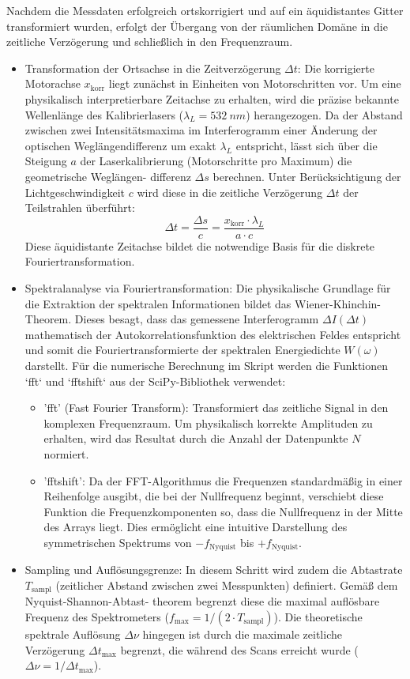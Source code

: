\documentclass[10pt,a4paper]{article}
\begin{document}
Nachdem die Messdaten erfolgreich ortskorrigiert und auf ein äquidistantes Gitter transformiert wurden, erfolgt der Übergang von der räumlichen Domäne in die zeitliche Verzögerung und schließlich in den Frequenzraum.

\begin{itemize}
       \item Transformation der Ortsachse in die Zeitverzögerung $\Delta t$: Die korrigierte Motorachse $x_{\text{korr}}$ liegt zunächst in Einheiten von Motorschritten vor. Um eine physikalisch interpretierbare Zeitachse zu erhalten, wird die präzise bekannte Wellenlänge des Kalibrierlasers ($\lambda_L = \qty{532}{nm}$) herangezogen. Da der Abstand zwischen zwei Intensitätsmaxima im Interferogramm einer Änderung der optischen Weglängendifferenz um exakt $\lambda_L$ entspricht, lässt sich über die Steigung $a$ der Laserkalibrierung (Motorschritte pro Maximum) die geometrische Weglängen- differenz $\Delta s$ berechnen. Unter Berücksichtigung der Lichtgeschwindigkeit $c$ wird diese in die zeitliche Verzögerung $\Delta t$ der Teilstrahlen überführt: $$\Delta t = \frac{\Delta s}{c} = \frac{x_{\text{korr}} \cdot \lambda_L}{a \cdot c}$$ Diese äquidistante Zeitachse bildet die notwendige Basis für die diskrete Fouriertransformation.
       \item Spektralanalyse via Fouriertransformation: Die physikalische Grundlage für die Extraktion der spektralen Informationen bildet das Wiener-Khinchin-Theorem. Dieses besagt, dass das gemessene Interferogramm $\Delta I(\Delta t)$ mathematisch der Autokorrelationsfunktion des elektrischen Feldes entspricht und somit die Fouriertransformierte der spektralen Energiedichte $W(\omega)$ darstellt. Für die numerische Berechnung im Skript werden die Funktionen `fft` und `fftshift` aus der SciPy-Bibliothek verwendet:
       \begin{itemize}
              \item 'fft' (Fast Fourier Transform): Transformiert das zeitliche Signal in den komplexen Frequenzraum. Um physikalisch korrekte Amplituden zu erhalten, wird das Resultat durch die Anzahl der Datenpunkte $N$ normiert.
              \item 'fftshift': Da der FFT-Algorithmus die Frequenzen standardmäßig in einer Reihenfolge ausgibt, die bei der Nullfrequenz beginnt, verschiebt diese Funktion die Frequenzkomponenten so, dass die Nullfrequenz in der Mitte des Arrays liegt. Dies ermöglicht eine intuitive Darstellung des symmetrischen Spektrums von $-f_{\text{Nyquist}}$ bis $+f_{\text{Nyquist}}$.
       \end{itemize}
       \item Sampling und Auflösungsgrenze: In diesem Schritt wird zudem die Abtastrate $T_{\text{sampl}}$ (zeitlicher Abstand zwischen zwei Messpunkten) definiert. Gemäß dem Nyquist-Shannon-Abtast- theorem begrenzt diese die maximal auflösbare Frequenz des Spektrometers ($f_{\text{max}} = 1 / (2 \cdot T_{\text{sampl}})$). Die theoretische spektrale Auflösung $\Delta \nu$ hingegen ist durch die maximale zeitliche Verzögerung $\Delta t_{\text{max}}$ begrenzt, die während des Scans erreicht wurde ($\Delta \nu = 1 / \Delta t_{\text{max}}$).
\end{itemize}
\end{document}
